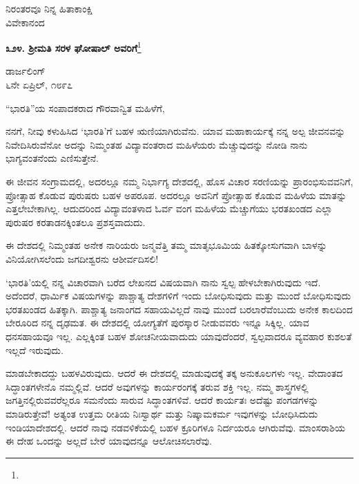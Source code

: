 \vspace{-0.5cm}

{\flushright
ನಿರಂತರವೂ ನಿನ್ನ ಹಿತಾಕಾಂಕ್ಷಿ\\ವಿವೇಕಾನಂದ\par}

\begin{center}
\textbf{೩೨೪. ಶ‍್ರೀಮತಿ ಸರಳ ಘೋಷಾಲ್ ಅವರಿಗೆ}\footnote{}
\end{center}

\vspace{-0.7cm}

\begin{flushright}
ಡಾರ್ಜಲಿಂಗ್\\೬ನೇ ಏಪ್ರಿಲ್, ೧೮೯೭
\end{flushright}

\vspace{-0.3cm}

\noindent
“ಭಾರತಿ”ಯ ಸಂಪಾದಕರಾದ ಗೌರವಾನ್ವಿತ ಮಹಿಳೆಗೆ,

ನನಗೆ, ನೀವು ಕಳುಹಿಸಿದ ‘ಭಾರತಿ’ಗೆ ಬಹಳ ಋಣಿಯಾಗಿರುವೆನು. ಯಾವ ಮಹಾಕಾರ್ಯಕ್ಕೆ ನನ್ನ ಅಲ್ಪ ಜೀವನವನ್ನು ನಿವೇದಿಸಿರುವೆನೋ ಅದನ್ನು ನಿಮ್ಮಂತಹ ವಿದ್ಯಾವಂತರಾದ ಮಹಿಳೆಯರು ಮೆಚ್ಚುವುದನ್ನು ನೋಡಿ ನಾನು ಭಾಗ್ಯವಂತನೆಂದು ಎಣಿಸುತ್ತೇನೆ.

ಈ ಜೀವನ ಸಂಗ್ರಾಮದಲ್ಲಿ, ಅದರಲ್ಲೂ ನಮ್ಮ ನಿರ್ಭಾಗ್ಯ ದೇಶದಲ್ಲಿ, ಹೊಸ ವಿಚಾರ ಸರಣಿಯನ್ನು ಪ್ರಾರಂಭಿಸುವವನಿಗೆ, ಪ್ರೋತ್ಸಾಹ ಕೊಡುವ ಪುರುಷರು ಬಹಳ ಅಪರೂಪ. ಅದರಲ್ಲೂ ಅವನಿಗೆ ಪ್ರೋತ್ಸಾಹ ಕೊಡುವ ಮಹಿಳೆಯ ಮಾತನ್ನು ಎತ್ತಲೇಬೇಕಾಗಿಲ್ಲ. ಆದುದರಿಂದ ವಿದ್ಯಾವಂತಳಾದ ಓರ್ವ ವಂಗ ಮಹಿಳೆಯ ಮೆಚ್ಚುಗೆಯು ಭರತಖಂಡದ ಎಲ್ಲಾ ಪುರುಷರ ಕರತಾಡನಕ್ಕಿಂತಲೂ ಪ್ರಶಸ್ತವಾದುದು.

ಈ ದೇಶದಲ್ಲಿ ನಿಮ್ಮಂತಹ ಅನೇಕ ನಾರಿಯರು ಜನ್ಮವೆತ್ತಿ ತಮ್ಮ ಮಾತೃಭೂಮಿಯ ಹಿತಕ್ಕೋಸುಗವಾಗಿ ಬಾಳನ್ನು ವಿನಿಯೋಗಿಸಲೆಂದು ಜಗದೀಶ್ವರನು ಆಶೀರ್ವದಿಸಲಿ!

‘ಭಾರತಿ’ಯಲ್ಲಿ ನನ್ನ ವಿಚಾರವಾಗಿ ಬರೆದ ಲೇಖನದ ವಿಷಯವಾಗಿ ನಾನು ಸ್ವಲ್ಪ ಹೇಳಬೇಕಾಗಿರುವುದು ಇದೆ. ಅದೆಂದರೆ, ಧಾರ್ಮಿಕ ವಿಷಯಗಳನ್ನು ಪಾಶ್ಚಾತ್ಯ ದೇಶಗಳಿಗೆ ಇಂದು ಬೋಧಿಸುವುದು ಮತ್ತು ಮುಂದೆ ಬೋಧಿಸುವುದು ಭರತಖಂಡದ ಹಿತಕ್ಕಾಗಿ. ಪಾಶ್ಚಾತ್ಯ ಜನಾಂಗದ ಸಹಾಯವಿಲ್ಲದೆ ನಾವು ಮುಂದೆ ಬರಲಾರೆವೆಂಬುದು ಅನೇಕ ಕಾಲದಿಂದ ಬೇರೂರಿದ ನನ್ನ ದೃಢಮತ. ಈ ದೇಶದಲ್ಲಿ ಯೋಗ್ಯತೆಗೆ ಪುರಸ್ಕಾರ ನೀಡುವವರು ಇನ್ನೂ ಸಿಕ್ಕಿಲ್ಲ. ಯಾವ ಧನಸಹಾಯವೂ ಇಲ್ಲ. ಎಲ್ಲಕ್ಕಿಂತ ಬಹಳ ಶೋಚನೀಯವಾದುದು ಯಾವುದೆಂದರೆ, ಸ್ವಲ್ಪವಾದರೂ ವ್ಯವಹಾರ ಕುಶಲತೆ ಇಲ್ಲದೆ ಇರುವುದು.

ಮಾಡಬೇಕಾದದ್ದು ಬಹಳವಿರುವುದು. ಆದರೆ ಈ ದೇಶದಲ್ಲಿ ಮಾಡುವುದಕ್ಕೆ ತಕ್ಕ ಅನುಕೂಲಗಳು ಇಲ್ಲ. ವೇದಾಂತದ ಸಿದ್ಧಾಂತಗಳೇನೊ ನಮ್ಮಲ್ಲಿವೆ. ಆದರೆ ಅವುಗಳನ್ನು ಕಾರ್ಯರಂಗಕ್ಕೆ ತರುವ ಶಕ್ತಿ ಇಲ್ಲ. ನಮ್ಮ ಶಾಸ್ತ್ರಗಳಲ್ಲಿ ಜಗತ್ತಿನಲ್ಲಿರುವವರೆಲ್ಲರೂ ಸಮನೆಂದು ಸಾರುವ ಸಿದ್ಧಾಂತಗಳಿವೆ. ಆದರೆ ಕಾರ್ಯತಃ ಅದೆಷ್ಟು ಪಂಗಡಗಳನ್ನು ಮಾಡಿರುತ್ತೇವೆ! ಅತ್ಯಂತ ಉತ್ತಮ ರೀತಿಯ ನಿಃಸ್ವಾರ್ಥ ಮತ್ತು ನಿಷ್ಕಾಮಕರ್ಮ ಇವುಗಳನ್ನು ಬೋಧಿಸಿದುದು ಇಂಡಿಯಾದೇಶದಲ್ಲಿ. ಆದರೆ ನಾವು ನಡವಳಿಕೆಯಲ್ಲಿ ಬಹಳ ಕ್ರೂರಿಗಳೂ ನಿರ್ದಯರೂ ಆಗಿರುವೆವು. ಮಾಂಸರಾಶಿಯ ಈ ದೇಹ ಒಂದನ್ನು ಅಲ್ಲದೆ ಬೇರೆ ಯಾವುದನ್ನೂ ಆಲೋಚಿಸಲಾರೆವು.

